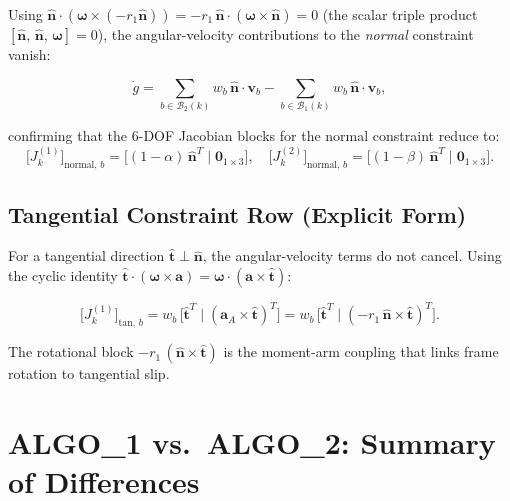 \documentclass[11pt, a4paper]{article}
\newcommand{\vv}[1]{\bm{#1}}
\newcommand{\nn}{\hat{\vv{n}}}
\begin{document}
Using $\nn \cdot (\bm{\omega} \times (-r_1\nn)) = -r_1\,\nn\cdot(\bm{\omega}\times\nn) = 0$
(the scalar triple product $[\nn,\,\nn,\,\bm{\omega}] = 0$), the
angular-velocity contributions to the \emph{normal} constraint vanish:

\begin{equation}
  \dot{g}
  = \sum_{b \in \mathcal{B}_2(k)} w_b\,\nn \cdot \vv{v}_b
  - \sum_{b \in \mathcal{B}_1(k)} w_b\,\nn \cdot \vv{v}_b,
  \label{eq:gdot_normal_simplified}
\end{equation}

confirming that the $6$-DOF Jacobian blocks for the normal constraint
reduce to:
\begin{equation}
  \bigl[J^{(1)}_k\bigr]_{\text{normal},\, b}
  = \bigl[(1-\alpha)\,\nn^T\;\big|\;\vv{0}_{1\times 3}\bigr],
  \quad
  \bigl[J^{(2)}_k\bigr]_{\text{normal},\, b}
  = \bigl[(1-\beta)\,\nn^T\;\big|\;\vv{0}_{1\times 3}\bigr].
  \label{eq:normal_Jblocks}
\end{equation}

\subsection{Tangential Constraint Row (Explicit Form)}

For a tangential direction $\hat{\vv{t}} \perp \nn$, the angular-velocity
terms do not cancel. Using the cyclic identity
$\hat{\vv{t}} \cdot (\bm{\omega} \times \vv{a}) = \bm{\omega} \cdot (\vv{a} \times \hat{\vv{t}})$:

\begin{equation}
  \bigl[J^{(1)}_k\bigr]_{\text{tan},\, b}
  = w_b\,\bigl[\hat{\vv{t}}^T\;\big|\; (\vv{a}_A \times \hat{\vv{t}})^T\bigr]
  = w_b\,\bigl[\hat{\vv{t}}^T\;\big|\; (-r_1\,\nn \times \hat{\vv{t}})^T\bigr].
  \label{eq:tangential_Jblocks}
\end{equation}

The rotational block $-r_1\,(\nn \times \hat{\vv{t}})$ is the moment-arm
coupling that links frame rotation to tangential slip.

\section{ALGO\_1 vs.\ ALGO\_2: Summary of Differences}
\end{document}
